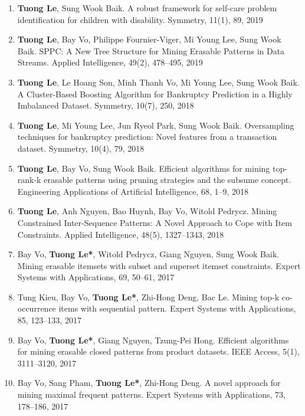 \documentclass[letterpaper]{article}
\begin{document}
\begin{enumerate}

\item \textbf{Tuong Le}, Sung Wook Baik. A robust framework for self-care problem identification for children with disability. Symmetry, 11(1), 89, 2019

\item \textbf{Tuong Le}, Bay Vo, Philippe Fournier-Viger, Mi Young Lee, Sung Wook Baik. SPPC: A New Tree Structure for Mining Erasable Patterns in Data Streams. Applied Intelligence, 49(2), 478--495, 2019

\item \textbf{Tuong Le}, Le Hoang Son, Minh Thanh Vo, Mi Young Lee, Sung Wook Baik. A Cluster-Based Boosting Algorithm for Bankruptcy Prediction in a Highly Imbalanced Dataset. Symmetry, 10(7), 250, 2018

\item \textbf{Tuong Le}, Mi Young Lee, Jun Ryeol Park, Sung Wook Baik. Oversampling techniques for bankruptcy prediction: Novel features from a transaction dataset. Symmetry, 10(4), 79, 2018

\item \textbf{Tuong Le}, Bay Vo, Sung Wook Baik. Efficient algorithms for mining top-rank-k erasable patterns using pruning strategies and the subsume concept. Engineering Applications of Artificial Intelligence, 68, 1--9, 2018

\item \textbf{Tuong Le}, Anh Nguyen, Bao Huynh, Bay Vo, Witold Pedrycz. Mining Constrained Inter-Sequence Patterns: A Novel Approach to Cope with Item Constraints. Applied Intelligence, 48(5), 1327--1343, 2018

\item Bay Vo, \textbf{Tuong Le*}, Witold Pedrycz, Giang Nguyen, Sung Wook Baik. Mining erasable itemsets with subset and superset itemset constraints. Expert Systems with Applications, 69, 50--61, 2017

\item Tung Kieu, Bay Vo, \textbf{Tuong Le*}, Zhi-Hong Deng, Bac Le. Mining top-k co-occurrence items with sequential pattern. Expert Systems with Applications, 85, 123--133, 2017

\item Bay Vo, \textbf{Tuong Le*}, Giang Nguyen, Tzung-Pei Hong. Efficient algorithms for mining erasable closed patterns from product datasets. IEEE Access, 5(1), 3111--3120, 2017

\item Bay Vo, Sang Pham, \textbf{Tuong Le*}, Zhi-Hong Deng. A novel approach for mining maximal frequent patterns. Expert Systems with Applications, 73, 178--186, 2017


\end{enumerate}
\end{document}
